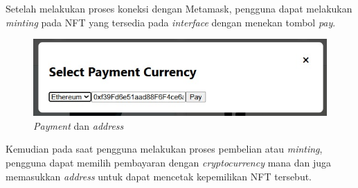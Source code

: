 Setelah melakukan proses koneksi dengan Metamask, pengguna dapat melakukan \emph{minting} pada NFT yang tersedia pada \emph{interface} dengan menekan tombol \emph{pay}.

\begin{figure} [H] \centering
  \includegraphics[scale=0.50]{gambar/payment.jpeg}
  \caption{\emph{Payment} dan \emph{address}}
  \label{fig:payment}
\end{figure}

Kemudian pada saat pengguna melakukan proses pembelian atau \emph{minting}, pengguna dapat memilih pembayaran dengan \emph{cryptocurrency} mana dan juga memasukkan \emph{address} untuk dapat mencetak kepemilikan NFT tersebut.

